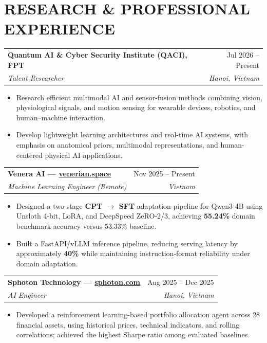 \documentclass[letterpaper,10pt]{article}
\makeatletter
\newcommand{\cvHeading}[4]{%
  \begin{tabular*}{\textwidth}
    {l@{\extracolsep{\fill}}r}
    \textbf{#1} & \color{subtle}#2 \\
    \textit{#3} & \textit{\color{subtle}#4} \\
  \end{tabular*}%
  \par\vspace{0pt}%
}
\newenvironment{experienceItems}
  {\begin{itemize}[
    leftmargin=1.2em,
    topsep=0pt,
    partopsep=0pt,
    itemsep=3pt,
    parsep=0pt
  ]}
  {\end{itemize}\vspace{7pt}}
\makeatother
\begin{document}
\section{RESEARCH \& PROFESSIONAL EXPERIENCE}

\cvHeading
{Quantum AI \& Cyber Security Institute (QACI), FPT}
{Jul 2026 -- Present}
{Talent Researcher}
{Hanoi, Vietnam}

\begin{experienceItems}

  \item Research efficient multimodal AI
  and sensor-fusion methods combining
  vision, physiological signals, and
  motion sensing for wearable devices,
  robotics, and human--machine interaction.

  \item Develop lightweight learning
  architectures and real-time AI systems,
  with emphasis on anatomical priors,
  multimodal representations, and
  human-centered physical AI applications.

\end{experienceItems}

\cvHeading
{Venera AI --- \href{https://venerian.space}
{venerian.space}}
{Nov 2025 -- Present}
{Machine Learning Engineer (Remote)}
{Vietnam}

\begin{experienceItems}

  \item Designed a two-stage
  \textbf{CPT $\rightarrow$ SFT}
  adaptation pipeline for Qwen3-4B
  using Unsloth 4-bit, LoRA, and
  DeepSpeed ZeRO-2/3, achieving
  \textbf{55.24\%} domain benchmark
  accuracy versus 53.33\% baseline.

  \item Built a FastAPI/vLLM inference
  pipeline, reducing serving latency
  by approximately \textbf{40\%}
  while maintaining instruction-format
  reliability under domain adaptation.

\end{experienceItems}

\cvHeading
{Sphoton Technology --- \href{https://sphoton.com/}
{sphoton.com}}
{Aug 2025 -- Dec 2025}
{AI Engineer}
{Hanoi, Vietnam}

\begin{experienceItems}

  \item Developed a reinforcement
  learning-based portfolio allocation
  agent across 28 financial assets,
  using historical prices, technical
  indicators, and rolling correlations;
  achieved the highest Sharpe ratio
  among evaluated baselines.

\end{experienceItems}
\end{document}
